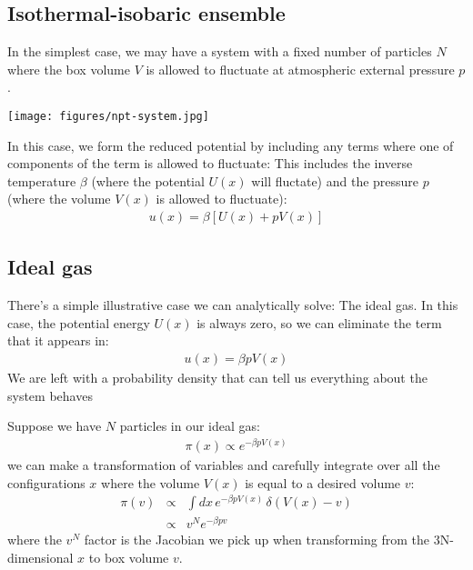 \documentclass[english,course]{lecture}
\begin{document}
\subsection{Isothermal-isobaric ensemble}

In the simplest case, we may have a system with a fixed number of particles $N$ where the box volume $V$ is allowed to fluctuate at atmospheric external pressure $p$.

\begin{centering}
\texttt{[image: figures/npt-system.jpg]}

\end{centering}

In this case, we form the reduced potential by including any terms where one of components of the term is allowed to fluctuate: This includes the inverse temperature $\beta$ (where the potential $U(x)$ will fluctate) and the pressure $p$ (where the volume $V(x)$ is allowed to fluctuate):
\begin{eqnarray}
u(x) = \beta \left[ U(x) + p V(x) \right]
\end{eqnarray}

\subsection{Ideal gas}

There's a simple illustrative case we can analytically solve: The ideal gas.
In this case, the potential energy $U(x)$ is always zero, so we can eliminate the term that it appears in:
\begin{eqnarray}
u(x) = \beta p V(x)
\end{eqnarray}
We are left with a probability density that can tell us everything about the system behaves~
 
Suppose we have $N$ particles in our ideal gas:
\begin{eqnarray}
\pi(x) \propto e^{-\beta p V(x)}
\end{eqnarray}
we can make a transformation of variables and carefully integrate over all the configurations $x$ where the volume $V(x)$ is equal to a desired volume $v$:
\begin{eqnarray}
\pi(v) &\propto& \int dx \, e^{-\beta p V(x)} \, \delta(V(x) - v) \\
&\propto& v^N e^{-\beta p v}
\end{eqnarray}
where the $v^N$ factor is the Jacobian we pick up when transforming from the 3N-dimensional $x$ to box volume $v$.
\end{document}

